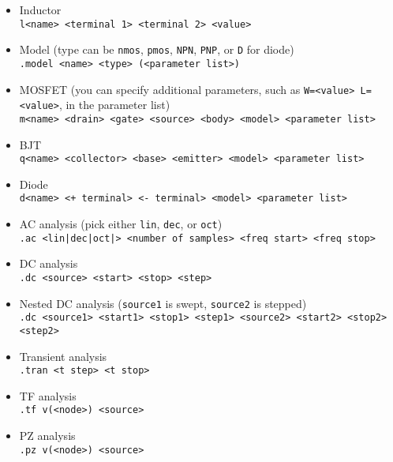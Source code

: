 \documentclass{article}
\begin{document}
\begin{itemize}
	\item Inductor \\ \verb|l<name> <terminal 1> <terminal 2> <value>|
	\item Model (type can be \verb|nmos|, \verb|pmos|, \verb|NPN|, \verb|PNP|, or \verb|D| for diode) \\ \verb|.model <name> <type> (<parameter list>)|
	\item MOSFET (you can specify additional parameters, such as \verb|W=<value> L=<value>|, in the parameter list) \\ \verb|m<name> <drain> <gate> <source> <body> <model> <parameter list>|
	\item BJT \\ \verb|q<name> <collector> <base> <emitter> <model> <parameter list>|
	\item Diode \\ \verb|d<name> <+ terminal> <- terminal> <model> <parameter list>|
	\item AC analysis (pick either \verb|lin|, \verb|dec|, or \verb|oct|) \\ \verb/.ac <lin|dec|oct|> <number of samples> <freq start> <freq stop>/
	\item DC analysis \\ \verb|.dc <source> <start> <stop> <step>|
	\item Nested DC analysis (\verb|source1| is swept, \verb|source2| is stepped) \\ \verb|.dc <source1> <start1> <stop1> <step1> <source2> <start2> <stop2> <step2>|
	\item Transient analysis \\ \verb|.tran <t step> <t stop>|
	\item TF analysis \\ \verb|.tf v(<node>) <source>|
	\item PZ analysis \\ \verb|.pz v(<node>) <source>|
\end{itemize}
\end{document}
